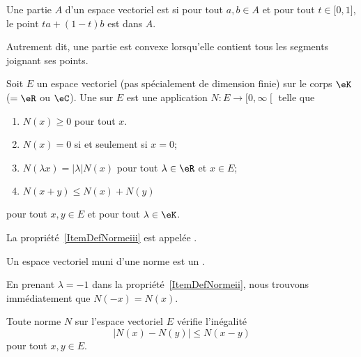 \begin{definition}        \label{DEFooQQEOooAFKbcQ}
    Une partie \( A\) d'un espace vectoriel est  si pour tout \( a,b\in A\) et pour tout \( t\in \mathopen[ 0 , 1 \mathclose]\), le point \( ta+(1-t)b\) est dans \( A\).

    Autrement dit, une partie est convexe lorsqu'elle contient tous les segments joignant ses points.
\end{definition}

\begin{definition}  \label{DefNorme}
    Soit \( E\) un espace vectoriel (pas spécialement de dimension finie) sur le corps \( \eK\) (\( =\eR\) ou \( \eC\)). Une   sur $E$ est une application $N\colon E\to\mathopen[ 0 , \infty \mathclose[$ telle que
	\begin{enumerate}
        \item
            \( N(x)\geq 0\) pour tout \( x\).
		\item
            \( N(x)=0\) si et seulement si \( x=0\);
		\item\label{ItemDefNormeii}
			$N(\lambda x)=| \lambda |N(x)$ pour tout $\lambda\in\eR$ et $x\in E$;
		\item\label{ItemDefNormeiii}
			$N(x+y)\leq N(x)+N(y)$
	\end{enumerate}
    pour tout $x,y\in E$ et pour tout $\lambda\in\eK$.

    La propriété~\ref{ItemDefNormeiii} est appelée .

    Un espace vectoriel muni d'une norme est un .
\end{definition}
En prenant $\lambda=-1$ dans la propriété~\ref{ItemDefNormeii}, nous trouvons immédiatement que $N(-x)=N(x)$.

\begin{proposition}		\label{PropNmNNm}
	Toute norme $N$ sur l'espace vectoriel $E$ vérifie l'inégalité
	\begin{equation}
		\big| N(x)-N(y) \big|\leq N(x-y)
	\end{equation}
	pour tout $x,y\in E$.
\end{proposition}


